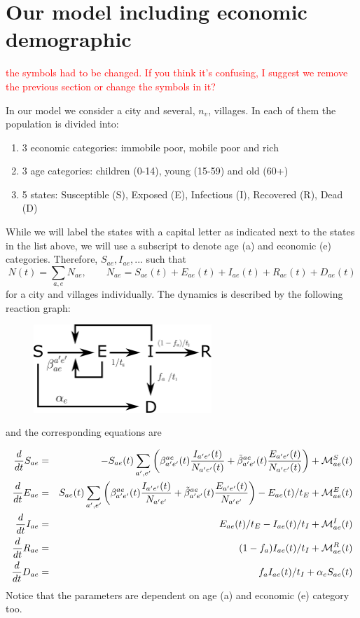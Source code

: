 \documentclass{article}
\begin{document}
\section{Our model including economic demographic}

\textcolor{red}{the symbols had to be changed. If you think it's confusing, I suggest we remove the previous section or change the symbols in it?}

In our model we consider a city and several, $n_v$, villages. 
In each of them the population is divided into:
\begin{enumerate}
	\item 3 economic categories: immobile poor, mobile poor and rich
	\item 3 age categories: children (0-14), young (15-59) and old (60+) 
	\item 5 states:  Susceptible (S), Exposed (E), Infectious (I), Recovered (R), Dead (D)
\end{enumerate}

While we will label the states with a capital letter as indicated next to the states in the list above, we will use a subscript to denote age (a) and economic (e) categories. Therefore, $S_{ae}, I_{ae},...$ such that \[ N(t) = \sum_{a,e} N_{ae}, \qquad N_{ae} = S_{ae}(t) + E_{ae}(t) + I_{ae}(t) + R_{ae}(t) +D_{ae}(t) \] for a city and villages individually. The dynamics is described by the following reaction graph:

\begin{figure}[H]
	\centering
	\includegraphics[width=0.6\textwidth]{our_scheme}
\end{figure}

and the corresponding equations are

\begin{eqnarray}
\frac{d}{dt} S_{ae} &=& - S_{ae}(t) \sum_{a',e'} \bigg( \beta^{ae}_{a'e'}(t) \frac{I_{a'e'}(t)}{N_{a'e'}(t)} + \tilde{\beta}^{ae}_{a'e'}(t) \frac{E_{a'e'}(t)}{N_{a'e'}(t)} \bigg) + \mathcal{M}^{S}_{ae}(t)\\
\frac{d}{dt} E_{ae} &=& S_{ae}(t) \sum_{a',e'} \bigg( \beta^{ae}_{a'e'}(t) \frac{I_{a'e'}(t)}{N_{a'e'}} + \tilde{\beta}^{ae}_{a'e'}(t) \frac{E_{a'e'}(t)}{N_{a'e'}} \bigg) - E_{ae}(t)/t_E + \mathcal{M}^{E}_{ae}(t)\\
\frac{d}{dt} I_{ae} &=& E_{ae}(t)/t_E - I_{ae}(t)/t_I + \mathcal{M}^{I}_{ae}(t)\\     
\frac{d}{dt} R_{ae} &=& (1- f_{a}) I_{ae}(t)/t_I  + \mathcal{M}^{R}_{ae}(t)\\
\frac{d}{dt} D_{ae} &=& f_{a} I_{ae}(t)/t_I + \alpha_e S_{ae}(t)
\end{eqnarray}
Notice that the parameters are dependent on age (a) and economic (e) category too.
\end{document}
